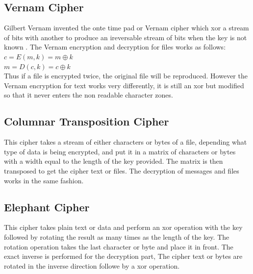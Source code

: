 \documentclass[11pt]{article}
\begin{document}
\subsection{Vernam Cipher}
Gilbert Vernam invented the onte time pad or Vernam cipher which xor a stream of bits with another to produce an ireversable stream of bits when the key is not known \cite{bellovin2011frank}.
The Vernam encryption and decryption for files works as follows\cite{vernam1919secret}:\\
$c = E(m, k) = m \oplus k$\\
$m = D(c, k) = c \oplus k$\\
Thus if a file is encrypted twice, the original file will be reproduced. However the Vernam encryption for text works very differently, it is still an xor but modified so that it never enters the non readable character zones.

\subsection{Columnar Transposition Cipher}
This cipher takes a stream of either characters or bytes of a file, depending what type of data is being encrypted, and put it in a matrix of characters or bytes with a width equal to the length of the key provided. The matrix is then transposed to get the cipher text or files. The decryption of messages and files works in the same fashion\cite{pfleeger2002security}.

\subsection{Elephant Cipher}
This cipher takes plain text or data and perform an xor operation with the key followed by rotating the result as many times as the length of the key. The rotation operation takes the last character or byte and place it in front. The exact inverse is performed for the decryption part, The cipher text or bytes are rotated in the inverse direction followe by a xor operation.
\end{document}
